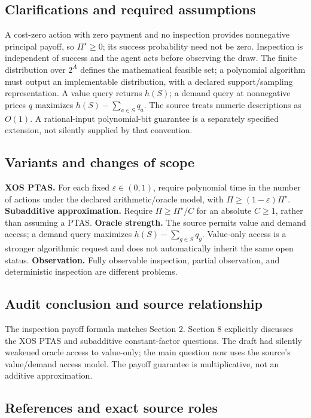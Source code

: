 \documentclass[11pt,a4paper]{article}
\begin{document}
\subsection*{Clarifications and required assumptions}

A cost-zero action with zero payment and no inspection provides nonnegative principal payoff, so \(\Pi^\star\geq0\); its success probability need not be zero. Inspection is independent of success and the agent acts before observing the draw. The finite distribution over \(2^A\) defines the mathematical feasible set; a polynomial algorithm must output an implementable distribution, with a declared support/sampling representation. A value query returns \(h(S)\); a demand query at nonnegative prices \(q\) maximizes \(h(S)-\sum_{a\in S}q_a\). The source treats numeric descriptions as \(O(1)\). A rational-input polynomial-bit guarantee is a separately specified extension, not silently supplied by that convention.

\subsection*{Variants and changes of scope}

\textbf{XOS PTAS.} For each fixed $\varepsilon\in(0,1)$, require polynomial time in the number of actions under the declared arithmetic/oracle model, with $\Pi\geq(1-\varepsilon)\Pi^\star$. \textbf{Subadditive approximation.} Require $\Pi\geq\Pi^\star/C$ for an absolute $C\geq1$, rather than assuming a PTAS. \textbf{Oracle strength.} The source permits value and demand access; a demand query maximizes $h(S)-\sum_{g\in S}q_g$. Value-only access is a stronger algorithmic request and does not automatically inherit the same open status. \textbf{Observation.} Fully observable inspection, partial observation, and deterministic inspection are different problems.

\subsection*{Audit conclusion and source relationship}

The inspection payoff formula matches Section 2. Section 8 explicitly discusses the XOS PTAS and subadditive constant-factor questions. The draft had silently weakened oracle access to value-only; the main question now uses the source's value/demand access model. The payoff guarantee is multiplicative, not an additive approximation.

\subsection*{References and exact source roles}
\end{document}
